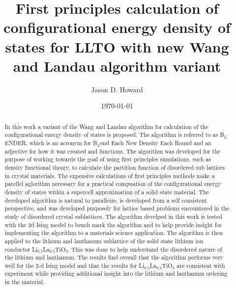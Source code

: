 \documentclass[aps,prl,reprint,superscriptaddress,showkeys]{revtex4-1}
\begin{document}
\title{First principles calculation of configurational energy density of states for LLTO with new Wang and Landau algorithm variant }

\author{Jason D. Howard}

\date{\today}

%


\begin{acknowledgments}
\end{acknowledgments}
\begin{abstract}
In this work  a variant of the Wang and Landau algorithm   for calculation of  the configurational energy density of states is proposed. The algorithm is referred to as B$_L$ENDER, which is an acronym for B$_L$end Each New Density Each Round and an  adjective for  how it was created and functions. The algorithm was developed for the purpose of working towards the goal of using first principles simulations, such as density functional theory, to calculate the partition function of disordered sub lattices in crystal materials. The expensive calculations of first principles methods make a parellel aglorithm necessary for a practical compuation of the configurational energy density of states within a supercell approximation of a solid state material. The developed algorithm is natural to paralleize, is developed from a self consistent perspective, and was developed purposely for lattice based problems encountered in the study of disordered crystal sublattices.  The algorithm develped in this work is tested with the 2d Ising model to bench mark the algorithm and to help provide insight for implementing the algorithm to a materials science application. The algorithm is then applied to the lithium and lanthanum sublattice of the solid state lithium ion conductor Li$_{0.5}$La$_{0.5}$TiO$_{3}$. This was done to help understand the disordered nature of the lithium and lanthanum. The results find overall that the algorithm performs very well for the 2-d Ising model and that the results for Li$_{0.5}$La$_{0.5}$TiO$_{3}$ are consistent with experiment while providing additional insight into the lithium and lanthanum ordering in the material. 
\end{abstract}
\maketitle
\end{document}
